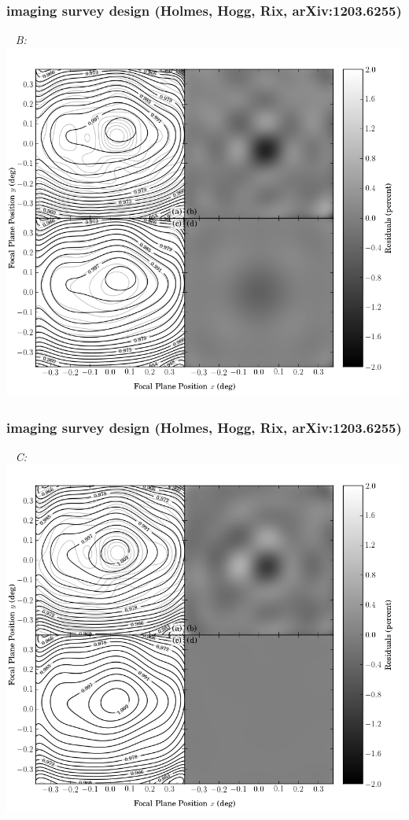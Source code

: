 \documentclass[pdftex]{beamer}
\begin{document}
\begin{frame}
  \frametitle{imaging survey design {\footnotesize (Holmes, Hogg, Rix, arXiv:1203.6255)}}
  ~\hfill%
  \emph{B:}~\includegraphics[height=\figureheight]{./1203.6255v2/B_1114_ff.png}
\end{frame}
\begin{frame}
  \frametitle{imaging survey design {\footnotesize (Holmes, Hogg, Rix, arXiv:1203.6255)}}
  ~\hfill%
  \emph{C:}~\includegraphics[height=\figureheight]{./1203.6255v2/C_24_ff.png}
\end{frame}
\end{document}
